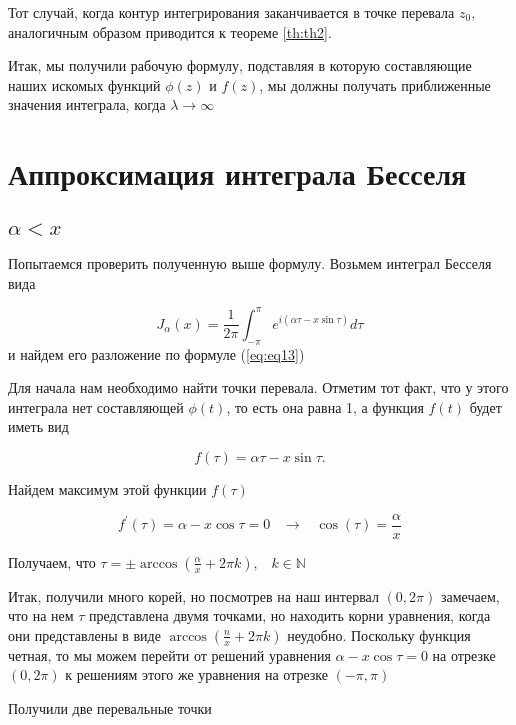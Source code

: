 \documentclass[14pt]{extarticle}
\begin{document}
Тот случай, когда контур интегрирования заканчивается в точке перевала $z_0$, аналогичным образом приводится к теореме \ref{th:th2}.

Итак, мы получили рабочую формулу, подставляя в которую составляющие наших искомых функций $\phi (z)$ и $f (z)$, мы должны получать приближенные значения интеграла, когда $\lambda \rightarrow \infty$ 

\section{Аппроксимация интеграла Бесселя}
\subsection{$\alpha<x$}
Попытаемся проверить полученную выше формулу. Возьмем интеграл Бесселя вида 

\begin{equation}\label{eq:eq14}
J_\alpha(x)=\frac{1}{2\pi}\int_{-\pi}^{\pi}e^{i(\alpha\tau-x\sin\tau)}d\tau
\end{equation} 
и найдем его разложение по формуле (\ref{eq:eq13})

Для начала нам необходимо найти точки перевала. Отметим тот факт, что у этого интеграла нет составляющей $\phi(t)$, то есть она равна 1, а функция $f(t)$ будет иметь вид 

\begin{equation}\nonumber
f(\tau) = \alpha \tau - x \sin \tau.
\end{equation} 

Найдем максимум этой функции $f(\tau)$

\begin{equation}\label{eq:eq15}
f^\prime(\tau) = \alpha - x \cos \tau = 0 \;\;\; \rightarrow \;\;\; \cos(\tau)=\frac{\alpha}{x}
\end{equation} 

Получаем, что $\tau = \pm \arccos\left(\frac{\alpha}{x} + 2\pi k \right), \;\;\; k \in \mathbb{N}$

Итак, получили много корей, но посмотрев на наш интервал $(0, 2\pi)$ замечаем, что на нем $\tau$ представлена двумя точками, но находить корни уравнения, когда они представлены в виде $\arccos\left(\frac{n}{x} + 2\pi k \right)$ неудобно. Поскольку функция четная, то мы можем перейти от решений уравнения $\alpha - x \cos \tau = 0$ на отрезке $(0, 2\pi)$ к решениям этого же уравнения на отрезке $(-\pi, \pi)$

Получили две перевальные точки
\end{document}
